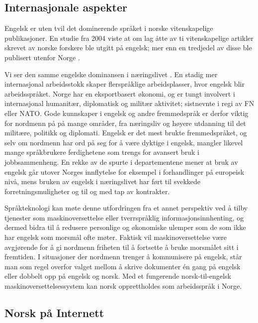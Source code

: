 \begin{multicols}{2}
\subsection{Internasjonale aspekter}

Engelsk er uten tvil det dominerende språket i norske vitenskapelige publikasjoner. En studie fra 2004 viste at om lag åtte av ti vitenskapelige artikler skrevet av norske forskere ble utgitt på engelsk; mer enn en tredjedel av disse ble publisert utenfor Norge \cite{schwach2004}.

Vi ser den samme engelske dominansen i næringslivet \cite{SR:2010,Hel:2010}. 
En stadig mer internasjonal arbeidsstokk skaper flerspråklige arbeidsplasser, hvor engelsk blir arbeidsspråket. 
Norge har en eksportbasert økonomi, og er tungt involvert i internasjonal humanitær, diplomatisk og militær aktivitet; sistnevnte i regi av FN eller NATO. 
Gode kunnskaper i engelsk og andre fremmedspråk er derfor viktig for nordmenn på på mange områder, fra næringsliv og høyere utdanning til det militære, politikk og diplomati.  
Engelsk er det mest brukte fremmedspråket, og selv om nordmenn har ord på seg for å være dyktige i engelsk, mangler likevel mange språkbrukere ferdighetene som trengs for avansert bruk i jobbsammenheng. 
En rekke av de spurte i departementene mener at bruk av engelsk går utover Norges innflytelse for eksempel i forhandlinger på europeisk nivå, mens bruken av engelsk i næringslivet har ført til svekkede  forretningsmuligheter og til og med tap av kontrakter. 


Språkteknologi kan møte denne utfordringen fra et annet perspektiv ved å tilby tjenester som maskinoversettelse eller tverrspråklig informasjonsinnhenting, og dermed bidra til å redusere personlige og økonomiske ulemper som de som ikke har engelsk som morsmål ofte møter. 
Faktisk vil maskinoversettelse være avgjørende for å gi nordmenn friheten til å fortsette å bruke morsmålet sitt i fremtiden. 
I situasjoner der nordmenn trenger å kommunisere på engelsk, står man som regel overfor valget mellom å skrive dokumenter én gang på engelsk eller dobbelt opp på engelsk og norsk. 
Med et fungerende norsk-til-engelsk maskinoversettelsessystem kan norsk opprettholdes som arbeidsspråk i Norge.

\subsection{Norsk på Internett}


\end{multicols}

